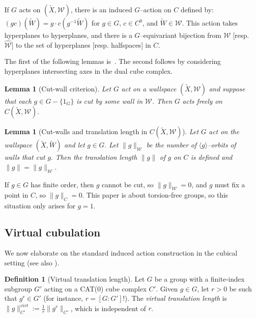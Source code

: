 \documentclass[11pt,oneside]{amsart}
\newcounter{ax}
\newtheorem{lem}[thm]{Lemma}
\theoremstyle{definition}
\newtheorem{defn}[thm]{Definition}
\begin{document}
If $G$ acts on $(\widetilde X,\mathcal W)$, there is an induced $G$--action on $C$ defined by: $(gc)(\widetilde W)=g\cdot c(g^{-1}\widetilde W)$ for $g\in G$, $c\in C^0$, and $\widetilde W\in\mathcal W$.  This action takes hyperplanes to hyperplanes, and there is a $G$--equivariant bijection from $\mathcal W$ [resp. $\widehat{\mathcal W}$] to the set of hyperplanes [resp. halfspaces] in $C$.

The first of the following lemmas is~\cite[Lemma~2.1]{Wise:tubular}. The second follows by considering hyperplanes intersecting axes in the dual cube complex.

\begin{lem}[Cut-wall criterion]\label{lem:free}
Let $G$ act on a wallspace $(\widetilde X,\mathcal W)$ and suppose that each $g\in G-\{1_G\}$ is cut by some wall in $\mathcal W$.  Then $G$ acts freely on $C(\widetilde X,\mathcal W)$.
\end{lem}

\begin{lem}[Cut-walls and translation length in $C(\widetilde X,\mathcal W)$]\label{lem:cut_wall_trans_length}
Let $G$ act on the wallspace $(\widetilde X,\widetilde W)$ and let $g\in G$.  Let $\|g\|_{\mathcal W}$ be the number of $\langle g\rangle$--orbits of walls that cut $g$.  Then the translation length $\|g\|$ of $g$ on $C$ is defined and $\|g\|=\|g\|_{\mathcal W}$.
\end{lem}

If $g\in G$ has finite order, then $g$ cannot be cut, so $\|g\|_{\mathcal 
W}=0$, and $g$ must fix a point in $C$, so $\|g\|_C=0$.  This paper is about torsion-free groups, so this situation only arises for $g=1$.

\subsection{Virtual cubulation}\label{subsec:virtual-cubulation}
We now elaborate on the standard induced action construction in the cubical setting (see also \cite[Lem. 7.13]{Wise:QCH}).    

\begin{defn}[Virtual translation length]\label{defn:vtl}
Let $G$ be a group with a finite-index subgroup $G'$ acting on a CAT(0) cube complex $C'$.  Given $g\in G$, let $r>0$ be such that $g^r\in G'$ (for instance, $r=[G:G']!$).  The \emph{virtual translation length} is $\|g\|^{virt}_{C'}:=\frac1r\|g^r\|_{C'}$, which is independent of $r$.  
\end{defn}
\end{document}
